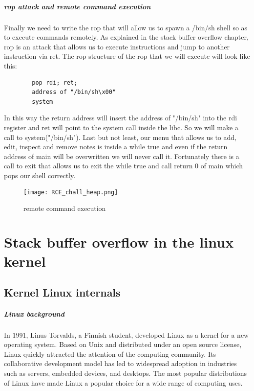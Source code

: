 \documentclass{report}
\begin{document}
    \paragraph{rop attack and remote command execution}
    Finally we need to write the rop that will allow us to spawn a /bin/sh shell so as to execute commands remotely.\newline
    As explained in the stack buffer overflow chapter, rop is an attack that allows us to execute instructions and jump to another instruction via ret.\newline
    The rop structure of the rop that we will execute will look like this:
    \begin{verbatim}
        pop rdi; ret;
        address of "/bin/sh\x00"
        system 
    \end{verbatim}
    In this way the return address will insert the address of "/bin/sh" into the rdi register and ret will point to the system call inside the libc.\newline
    So we will make a call to system("/bin/sh").\newline
    Last but not least, our menu that allows us to add, edit, inspect and remove notes is inside a while true and even if the return address of main will be overwritten we will never call it.\newline
    Fortunately there is a call to exit that allows us to exit the while true and call return 0 of main which pops our shell correctly.\newline
    \begin{figure}[htbp]
        \centering
        \texttt{[image: RCE\_chall\_heap.png]}
        \caption{remote command execution}
        \label{fig:enter-label}
    \end{figure}
    \clearpage
    \chapter{Stack buffer overflow in the linux kernel}
    \section{Kernel Linux internals}
    \paragraph{Linux background}
    In 1991, Linus Torvalds, a Finnish student, developed Linux as a kernel for a new operating system. Based on Unix and distributed under an open source license, Linux quickly attracted the attention of the computing community. \newline
    Its collaborative development model has led to widespread adoption in industries such as servers, embedded devices, and desktops.\newline
    The most popular distributions of Linux have made Linux a popular choice for a wide range of computing uses.\newline
\end{document}
